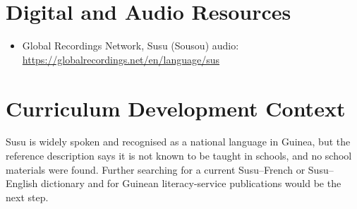 \documentclass[12pt]{article}
\begin{document}
\section{Digital and Audio Resources}
\begin{itemize}
\item Global Recordings Network, Susu (Sousou) audio: \url{https://globalrecordings.net/en/language/sus}
\end{itemize}

\section{Curriculum Development Context}
Susu is widely spoken and recognised as a national language in Guinea, but the reference description says it is not known to be taught in schools, and no school materials were found. Further searching for a current Susu--French or Susu--English dictionary and for Guinean literacy-service publications would be the next step.
\end{document}
